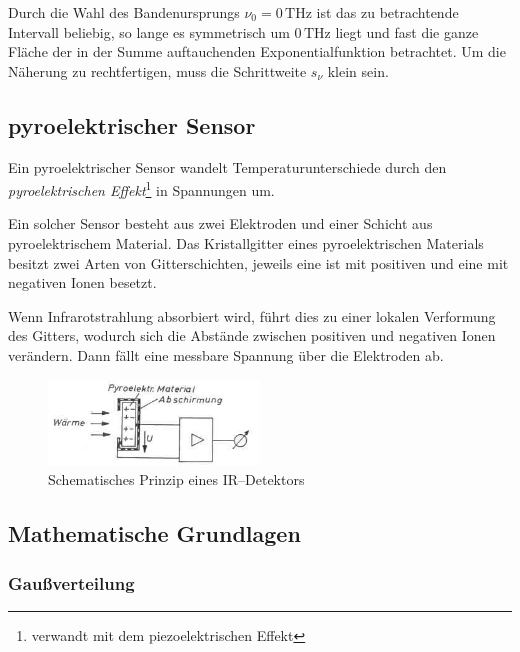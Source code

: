 \documentclass[12pt,a4paper]{scrartcl}
\numberwithin{equation}{section} %
\begin{document}
	\noindent
	Durch die Wahl des Bandenursprungs $\nu_0=0\mathrm{\,THz}$ ist das zu betrachtende Intervall beliebig, so lange es symmetrisch um $0\mathrm{\,THz}$ liegt und fast die ganze Fläche der in der Summe auftauchenden Exponentialfunktion betrachtet. Um die Näherung zu rechtfertigen, muss die Schrittweite $s_\nu$ klein sein.
	
	\subsection{pyroelektrischer Sensor}
	Ein pyroelektrischer Sensor wandelt Temperaturunterschiede durch den \emph{pyroelektrischen Effekt}\footnote{verwandt mit dem piezoelektrischen Effekt} in Spannungen um.
	
	Ein solcher Sensor besteht aus zwei Elektroden und einer Schicht aus pyroelektrischem Material. Das Kristallgitter eines pyroelektrischen Materials besitzt zwei Arten von Gitterschichten, jeweils eine ist mit positiven und eine mit negativen Ionen besetzt. \cite{pyroelektrischer Sensor}
	
	Wenn Infrarotstrahlung absorbiert wird, führt dies zu einer lokalen Verformung des Gitters, wodurch sich die Abstände zwischen positiven und negativen Ionen verändern. Dann fällt eine messbare Spannung über die Elektroden ab.
	
	\begin{figure}[h!]
		\centering
		\includegraphics[width=0.5\textwidth]{../media/B1.1/IR_Sensor.jpg}
		\caption{Schematisches Prinzip eines IR--Detektors \cite{pyroelektrischer Sensor}}
		\label{abb:pyroelektrischer Sensor}
	\end{figure}
	
	\hypertarget{mathematische-grundlagen}{%
		\subsection{Mathematische Grundlagen}\label{mathematische-grundlagen}}
	
	\hypertarget{gauuxdfverteilung}{%
		\subsubsection{Gaußverteilung}\label{gauuxdfverteilung}}
	
\end{document}

